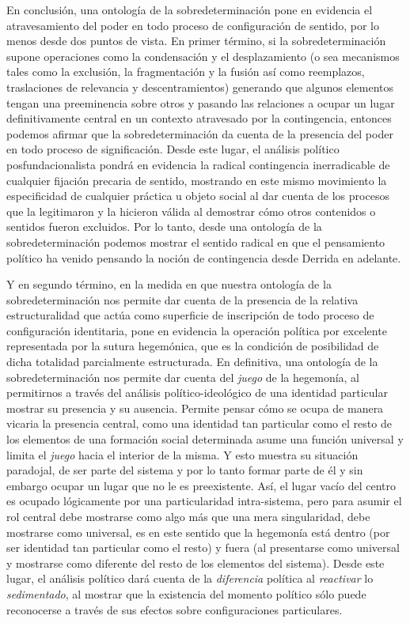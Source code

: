 En conclusión, una ontología de la sobredeterminación pone en evidencia el atravesamiento del poder en todo proceso de configuración de sentido, por lo menos desde dos puntos de vista. En primer término, si la sobredeterminación supone operaciones como la condensación y el desplazamiento (o sea mecanismos tales como la exclusión, la fragmentación y la fusión así como reemplazos, traslaciones de relevancia y descentramientos) generando que algunos elementos tengan una preeminencia sobre otros y pasando las relaciones a ocupar un lugar definitivamente central en un contexto atravesado por la contingencia, entonces podemos afirmar que la sobredeterminación da cuenta de la presencia del poder en todo proceso de significación. Desde este lugar, el análisis político posfundacionalista pondrá en evidencia la radical contingencia inerradicable de cualquier fijación precaria de sentido, mostrando en este mismo movimiento la especificidad de cualquier práctica u objeto social al dar cuenta de los procesos que la legitimaron y la hicieron válida al demostrar cómo otros contenidos o sentidos fueron excluidos. Por lo tanto, desde una ontología de la sobredeterminación podemos mostrar el sentido radical en que el pensamiento político ha venido pensando la noción de contingencia desde Derrida en adelante.

Y en segundo término, en la medida en que nuestra ontología de la sobredeterminación nos permite dar cuenta de la presencia de la relativa estructuralidad que actúa como superficie de inscripción de todo proceso de configuración identitaria, pone en evidencia la operación política por excelente representada por la sutura hegemónica, que es la condición de posibilidad de dicha totalidad parcialmente estructurada. En definitiva, una ontología de la sobredeterminación nos permite dar cuenta del \emph{juego} de la hegemonía, al permitirnos a través del análisis político-ideológico de una identidad particular mostrar su presencia y su ausencia. Permite pensar cómo se ocupa de manera vicaria la presencia central, como una identidad tan particular como el resto de los elementos de una formación social determinada asume una función universal y limita el \emph{juego} hacia el interior de la misma. Y esto muestra su situación paradojal, de ser parte del sistema y por lo tanto formar parte de él y sin embargo ocupar un lugar que no le es preexistente. Así, el lugar vacío del centro es ocupado lógicamente por una particularidad intra-sistema, pero para asumir el rol central debe mostrarse como algo más que una mera singularidad, debe mostrarse como universal, es en este sentido que la hegemonía está dentro (por ser identidad tan particular como el resto) y fuera (al presentarse como universal y mostrarse como diferente del resto de los elementos del sistema). Desde este lugar, el análisis político dará cuenta de la \emph{diferencia} política al \emph{reactivar} lo \emph{sedimentado}, al mostrar que la existencia del momento político sólo puede reconocerse a través de sus efectos sobre configuraciones particulares.

